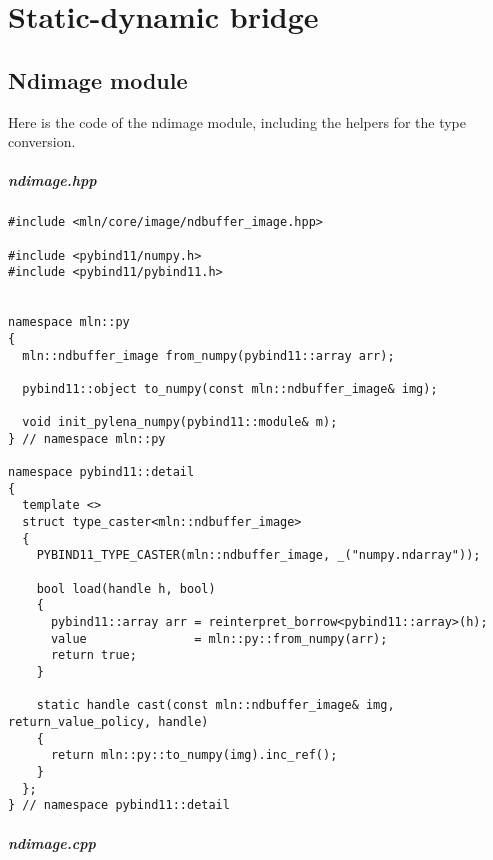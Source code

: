 \chapter{Static-dynamic bridge}
\label{appendix:static-dynamic-bridge}


\section{Ndimage module}
\label{appendix:static-dynamic-bridge.ndimage}

Here is the code of the ndimage module, including the helpers for the type conversion.

\paragraph{ndimage.hpp}
\label{appendix:static-dynamic-bridge.ndimage.hpp}

\begin{verbatim}
#include <mln/core/image/ndbuffer_image.hpp>

#include <pybind11/numpy.h>
#include <pybind11/pybind11.h>


namespace mln::py
{
  mln::ndbuffer_image from_numpy(pybind11::array arr);

  pybind11::object to_numpy(const mln::ndbuffer_image& img);

  void init_pylena_numpy(pybind11::module& m);
} // namespace mln::py

namespace pybind11::detail
{
  template <>
  struct type_caster<mln::ndbuffer_image>
  {
    PYBIND11_TYPE_CASTER(mln::ndbuffer_image, _("numpy.ndarray"));

    bool load(handle h, bool)
    {
      pybind11::array arr = reinterpret_borrow<pybind11::array>(h);
      value               = mln::py::from_numpy(arr);
      return true;
    }

    static handle cast(const mln::ndbuffer_image& img, return_value_policy, handle)
    {
      return mln::py::to_numpy(img).inc_ref();
    }
  };
} // namespace pybind11::detail
\end{verbatim}

\paragraph{ndimage.cpp}
\label{appendix:static-dynamic-bridge.ndimage.cpp}

